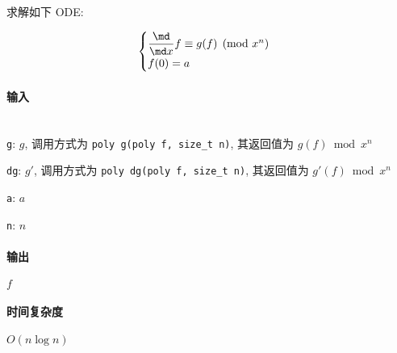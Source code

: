 求解如下 ODE:

\[
    \begin{cases}
        \dfrac{\md}{\md x}f\equiv g(f)\pmod{x^n} \\
        f(0)=a
    \end{cases}
\]

\paragraph{输入}~\\

\verb|g|: \(g\), 调用方式为 \verb|poly g(poly f, size_t n)|, 其返回值为 \(g(f)\bmod{x^n}\)

\verb|dg|: \(g'\), 调用方式为 \verb|poly dg(poly f, size_t n)|, 其返回值为 \(g'(f)\bmod{x^n}\)

\verb|a|: \(a\)

\verb|n|: \(n\)

\paragraph{输出}

\(f\)

\paragraph{时间复杂度}

\(O(n\log n)\)
